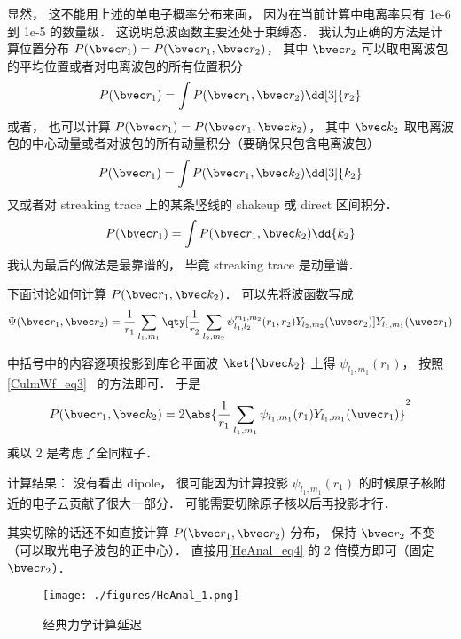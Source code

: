 显然， 这不能用上述的单电子概率分布来画， 因为在当前计算中电离率只有 1e-6 到 1e-5 的数量级． 这说明总波函数主要还处于束缚态． 我认为正确的方法是计算位置分布 $P(\bvec r_1) = P(\bvec r_1, \bvec r_2)$， 其中 $\bvec r_2$ 可以取电离波包的平均位置或者对电离波包的所有位置积分
\begin{equation}
P(\bvec r_1) = \int P(\bvec r_1, \bvec r_2) \dd[3]{r_2}
\end{equation}
或者， 也可以计算 $P(\bvec r_1) = P(\bvec r_1, \bvec k_2)$， 其中 $\bvec k_2$ 取电离波包的中心动量或者对波包的所有动量积分（要确保只包含电离波包）
\begin{equation}
P(\bvec r_1) = \int P(\bvec r_1, \bvec k_2) \dd[3]{k_2}
\end{equation}
又或者对 streaking trace 上的某条竖线的 shakeup 或 direct 区间积分．
\begin{equation}
P(\bvec r_1) = \int P(\bvec r_1, \bvec k_2) \dd{k_2}
\end{equation}
我认为最后的做法是最靠谱的， 毕竟 streaking trace 是动量谱．

下面讨论如何计算 $P(\bvec r_1, \bvec k_2)$． 可以先将波函数写成
\begin{equation}\label{HeAnal_eq4}
\Psi(\bvec r_1, \bvec r_2) = \frac{1}{r_1}\sum_{l_1,m_1} \qty[\frac{1}{r_2}\sum_{l_2,m_2} \psi_{l_1,l_2}^{m_1,m_2}(r_1, r_2) Y_{l_2,m_2}(\uvec r_2)] Y_{l_1,m_1}(\uvec r_1)
\end{equation}

中括号中的内容逐项投影到库仑平面波 $\ket{\bvec k_2}$ 上得 $\psi_{l_1,m_1}(r_1)$， 按照\autoref{CulmWf_eq3}~ 的方法即可． 于是
\begin{equation}\label{HeAnal_eq1}
P(\bvec r_1, \bvec k_2) = 2\abs{\frac{1}{r_1}\sum_{l_1,m_1} \psi_{l_1,m_1}(r_1) Y_{l_1,m_1}(\uvec r_1)}^2
\end{equation}
乘以 2 是考虑了全同粒子．

计算结果： 没有看出 dipole， 很可能因为计算投影 $\psi_{l_1,m_1}(r_1)$ 的时候原子核附近的电子云贡献了很大一部分． 可能需要切除原子核以后再投影才行．

其实切除的话还不如直接计算 $P(\bvec r_1, \bvec r_2)$ 分布， 保持 $\bvec r_2$ 不变（可以取光电子波包的正中心）． 直接用\autoref{HeAnal_eq4} 的 2 倍模方即可（固定 $\bvec r_2$）．

\begin{figure}[ht]
\centering
\texttt{[image: ./figures/HeAnal\_1.png]}
\caption{经典力学计算延迟} \label{HeAnal_fig1}
\end{figure}

